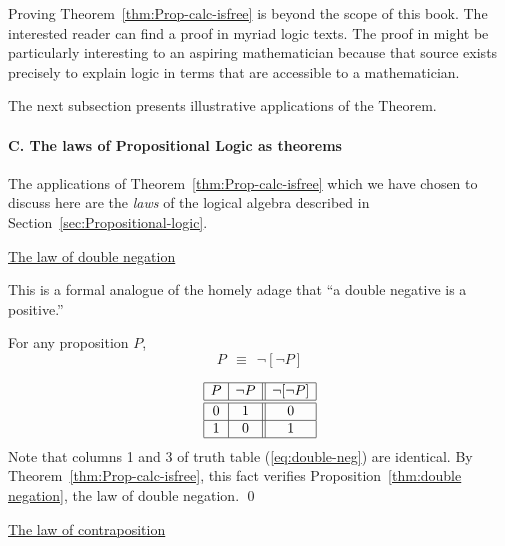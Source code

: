 Proving Theorem~\ref{thm:Prop-calc-isfree} is beyond the scope of this book.  The interested reader can find a proof in myriad logic texts.  The proof in  \cite{Rosser53} might be particularly interesting to an aspiring mathematician because that source exists precisely to explain logic in terms that are accessible to a mathematician.

\bigskip

The next subsection presents illustrative applications of the Theorem.

\paragraph{C. The laws of Propositional Logic as theorems}

The applications of Theorem~\ref{thm:Prop-calc-isfree} which we have chosen to discuss here are the {\em laws} of the logical algebra described in Section~\ref{sec:Propositional-logic}.

\bigskip

\noindent
\underline{\small\sf The law of double negation}

\smallskip

\noindent
This is a formal analogue of the homely adage that ``a double negative is a positive.''

\begin{prop}
\label{thm:double negation}
For any proposition $P$,
\[ P \ \ \equiv \ \ \neg [\neg P] \]
\end{prop}

\begin{equation}
\label{eq:double-neg}
\begin{array}{|c|c||c|}
\hline
P & \neg P & \neg[\neg P] \\
\hline
\hline
0 & 1 & 0 \\
\hline
1 & 0 & 1 \\
\hline
\end{array}
\end{equation}
Note that columns 1 and 3 of truth table (\ref{eq:double-neg}) are identical.  By Theorem~\ref{thm:Prop-calc-isfree}, this fact verifies Proposition~\ref{thm:double negation}, the law of double negation.  \qed

\bigskip

\noindent 
\underline{\small\sf The law of contraposition}

